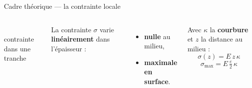\documentclass[11pt,aspectratio=169]{beamer}
\begin{document}
\begin{frame}{Cadre théorique --- la contrainte locale}
\begin{columns}[c]
\\[3pt]
    {\scriptsize contrainte dans une tranche}

    \footnotesize
    La contrainte $\sigma$ varie \textbf{linéairement} dans l'épaisseur :
    \begin{itemize}
      \item \textbf{nulle} au milieu,
      \item \textbf{maximale en surface}.
    \end{itemize}
    Avec $\kappa$ la \textbf{courbure} et $z$ la distance au milieu :
    \[ \sigma(z)=E\,z\,\kappa \]
    \[ \boxed{\;\sigma_{\max}=E\,\tfrac{e}{2}\,\kappa\;} \]
  \end{columns}
\end{frame}
\end{document}
